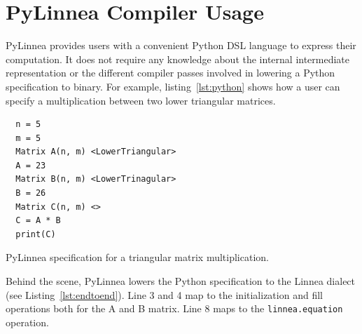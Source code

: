 \documentclass[conference]{IEEEtran}
\begin{document}
\section{PyLinnea Compiler Usage}

PyLinnea provides users with a convenient Python DSL language to express their
computation. It does not require any knowledge about the internal intermediate
representation or the different compiler passes involved in lowering a Python
specification to binary. For example, listing~\ref{lst:python} shows how a user
can specify a multiplication between two lower triangular matrices. 

\begin{listing}[]
\begin{center}
\begin{minipage}[]{0.5\textwidth}
\begin{verbatim}
  n = 5
  m = 5
  Matrix A(n, m) <LowerTriangular>
  A = 23
  Matrix B(n, m) <LowerTrinagular>
  B = 26
  Matrix C(n, m) <>
  C = A * B
  print(C)
\end{verbatim}
\end{minipage}
  \caption{PyLinnea specification for a triangular matrix multiplication.}
\label{lst:python}
\end{center}
\end{listing}

Behind the scene, PyLinnea lowers the Python specification to the Linnea
dialect (see Listing~\ref{lst:endtoend}).  Line 3 and 4 map to the
initialization and fill operations both for the A and B matrix. Line 8 maps to
the \texttt{linnea.equation} operation. 
\end{document}
